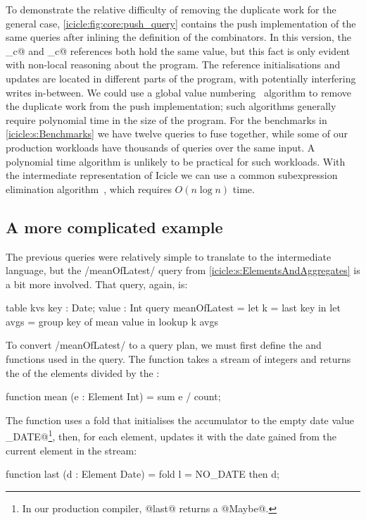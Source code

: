 To demonstrate the relative difficulty of removing the duplicate work for the general case, \cref{icicle:fig:core:push_query} contains the push implementation of the same queries after inlining the definition of the combinators.
In this version, the \IcC@more_c@ and \IcC@mean_c@ references both hold the same value, but this fact is only evident with non-local reasoning about the program.
The reference initialisations and updates are located in different parts of the program, with potentially interfering writes in-between.
We could use a global value numbering~\citep{gulwani2004polynomial} algorithm to remove the duplicate work from the push implementation; such algorithms generally require polynomial time in the size of the program.
For the benchmarks in \cref{icicle:s:Benchmarks} we have twelve queries to fuse together, while some of our production workloads have thousands of queries over the same input.
A polynomial time algorithm is unlikely to be practical for such workloads.
With the intermediate representation of Icicle we can use a common subexpression elimination algorithm~\cite{chitil1997common}, which requires $O(n \log n)$ time.

\subsection{A more complicated example}

The previous queries were relatively simple to translate to the intermediate language, but the \Hs/meanOfLatest/ query from \cref{icicle:s:ElementsAndAggregates} is a bit more involved.
That query, again, is:

\begin{icicle}
  table kvs { key : Date; value : Int } 
  query meanOfLatest
   = let k    = last  key in
     let avgs = group key of mean value in
     lookup k avgs
\end{icicle}

To convert \Hs/meanOfLatest/ to a query plan, we must first define the \IcC@mean@ and \IcC@last@ functions used in the query.
The \IcC@mean@ function takes a stream of integers and returns the \IcC@sum@ of the elements divided by the \IcC@count@:
\begin{icicle}
function mean (e : Element Int)
 = sum e / count;
\end{icicle}

The \IcC@last@ function uses a fold that initialises the accumulator to the empty date value \IcC@NO_DATE@\footnote{In our production compiler, @last@ returns a @Maybe@.}, then, for each element, updates it with the date gained from the current element in the stream:
\begin{icicle}
function last (d : Element Date)
 = fold l = NO_DATE then d;
\end{icicle}

